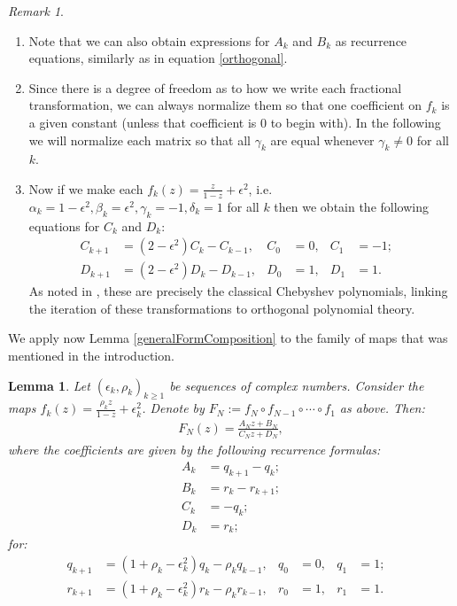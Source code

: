 \documentclass{amsart}
\newtheorem{lemma}{Lemma}
\theoremstyle{remark}
\newtheorem*{remark}{Remark}
\theoremstyle{definition}
\newcommand{\al}{\alpha}
\newcommand{\be}{\beta}
\newcommand{\ga}{\gamma}
\newcommand{\de}{\delta}
\begin{document}
\begin{remark}\mbox{}
\begin{enumerate}
\item Note that we can also obtain expressions for $A_k$ and $B_k$ as recurrence equations, similarly as in equation \eqref{orthogonal}.
\item Since there is a degree of freedom as to how we write each fractional transformation, we can always normalize them so that one coefficient on $f_k$ is a given constant (unless that coefficient is $0$ to begin with).  In the following we will normalize each matrix so that all $\ga_k$ are equal whenever $\gamma_k\neq 0$ for all $k$.
\item Now if we make each $\displaystyle{f_k(z) =\frac{z}{1-z}+\epsilon^2}$, i.e. $\al_k=1-\epsilon^2, \be_k=\epsilon^2, \ga_k=-1, \de_k=1$ for all $k$ then we obtain the following equations for $C_k$ and $D_k$:
\begin{align*}
    C_{k+1} &= (2-\epsilon^2)C_k - C_{k-1}, & C_0 &= 0, & C_1&= -1; &\\
    D_{k+1} &= (2-\epsilon^2)D_k - D_{k-1}, & D_0 &= 1, & D_1&= 1.&
\end{align*}
As noted in \cite{Viv20}, these are precisely the classical Chebyshev polynomials, linking
the iteration of these transformations to orthogonal polynomial theory.
\end{enumerate}
\end{remark}

We apply now Lemma \ref{generalFormComposition} to the family of maps that was mentioned in the introduction. 

\begin{lemma}\label{lem:recursivepoly}
Let $(\epsilon_k,\rho_k)_{k \geq 1}$ be sequences of complex numbers. Consider the 
maps $\displaystyle{f_{k}(z) = \frac{\rho_{k}z}{1-z}+\epsilon_{k}^2}$. 
Denote  by $F_N:=f_N \circ f_{N-1} \circ \cdots \circ f_1$ as above. Then: 
 \begin{align*}
F_N(z) = \frac{A_N z + B_N}{C_N z +D_N},
\end{align*}
where the coefficients are given by the following recurrence formulas:
\begin{align*}
A_{k} &= q_{k+1}-q_{k};\\
B_{k} &= r_{k}-r_{k+1}; \\
C_{k} &= -q_{k};\\
D_{k} &= r_{k};
\end{align*}
for:
\begin{align*}
q_{k+1} &= (1+\rho_k-\epsilon_{k}^{2}) q_k-\rho_k q_{k-1}, & q_0&=0, & q_1&=1;& \nonumber \\
r_{k+1} &= (1+\rho_k-\epsilon_{k}^{2}) r_k-\rho_k r_{k-1},& r_0&=1, & r_1&=1. &    
\end{align*}
\end{lemma}
\end{document}
